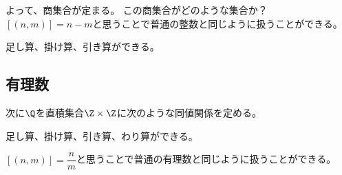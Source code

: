 よって、商集合が定まる。
この商集合がどのような集合か？
$[(n,m)]=n-m$と思うことで普通の整数と同じように扱うことができる。

足し算、掛け算、引き算ができる。

\subsection{有理数}

次に$\Q$を直積集合$\Z\times\Z$に次のような同値関係を定める。

足し算、掛け算、引き算、わり算ができる。

$[(n,m)]=\dfrac{n}{m}$と思うことで普通の有理数と同じように扱うことができる。
